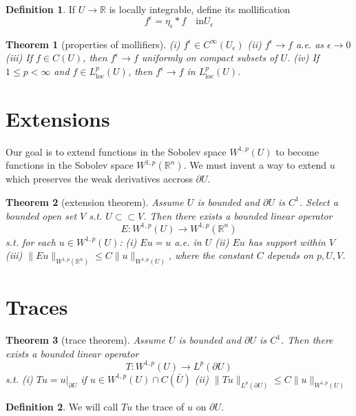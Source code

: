 \documentclass{article}
\newtheorem{theorem}{Theorem}[section]
\theoremstyle{definition}
\newtheorem{definition}{Definition}[section]
\begin{document}
\begin{definition}
    If $U\to\mathbb{R}$ is locally integrable, define its mollification 
    \[f^\epsilon=\eta_\epsilon*f\quad \text{in} U_\epsilon\]
\end{definition}

\begin{theorem}[properties of mollifiers]
    (i) $f^\epsilon\in C^\infty (U_\epsilon)$\newline 
    (ii) $f^\epsilon\to f$ a.e. as $\epsilon\to 0$\newline 
    (iii) If $f\in C(U)$, then $f^\epsilon\to f$ uniformly on compact subsets of $U$.\newline 
    (iv) If $1\le p<\infty$ and $f\in L^p_{\text{loc}}(U)$, then $f^\epsilon\to f$ in $L^p_{\text{loc}}(U)$.
\end{theorem}

\section{Extensions}
Our goal is to extend functions in the Sobolev space $W^{1,p}(U)$ to become functions in the Sobolev space $W^{1,p}(\mathbb{R}^n)$.
We must invent a way to extend $u$ which preserves the weak derivatives accross $\partial U$.

\begin{theorem}[extension theorem]
    Assume $U$ is bounded and $\partial U$ is $C^1$. Select a bounded open set $V$ s.t. $U\subset \subset V$. Then there exists a bounded linear operator 
    \[ E:W^{1,p}(U)\to W^{1,p}(\mathbb{R}^n)\] 
    s.t. for each $u\in W^{1,p}(U)$:\newline 
    (i) $Eu=u$ a.e. in $U$\newline 
    (ii) $Eu$ has support within $V$\newline 
    (iii) $\|Eu\|_{W^{1,p}(\mathbb{R}^n)}\le C\|u\|_{W^{1,p}(U)}$, where the constant $C$ depends on $p,U,V$.
\end{theorem}


\section{Traces}

\begin{theorem}[trace theorem]
    Assume $U$ is bounded and $\partial U$ is $C^1$. Then there exists a bounded linear operator 
    \[T:W^{1,p}(U)\to L^p(\partial U)\] 
    s.t. \newline 
    (i) $Tu=u|_{\partial U}$ if $u\in W^{1,p}(U)\cap C(\bar{U})$ \newline 
    (ii) $\|Tu\|_{L^p(\partial U)}\le C\|u\|_{W^{1,p}(U)}$
\end{theorem}
\begin{definition}
    We will call $Tu$ the trace of $u$ on $\partial U$.
\end{definition}
\end{document}
